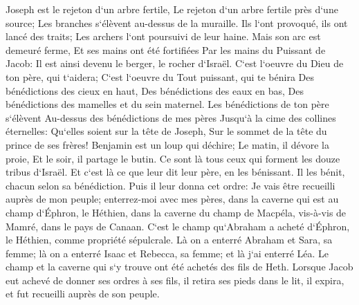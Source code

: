 \verse Joseph est le rejeton d`un arbre fertile, Le rejeton d`un arbre fertile près d`une source; Les branches s`élèvent au-dessus de la muraille. 
\verse Ils l`ont provoqué, ils ont lancé des traits; Les archers l`ont poursuivi de leur haine. 
\verse Mais son arc est demeuré ferme, Et ses mains ont été fortifiées Par les mains du Puissant de Jacob: Il est ainsi devenu le berger, le rocher d`Israël. 
\verse C`est l`oeuvre du Dieu de ton père, qui t`aidera; C`est l`oeuvre du Tout puissant, qui te bénira Des bénédictions des cieux en haut, Des bénédictions des eaux en bas, Des bénédictions des mamelles et du sein maternel. 
\verse Les bénédictions de ton père s`élèvent Au-dessus des bénédictions de mes pères Jusqu`à la cime des collines éternelles: Qu`elles soient sur la tête de Joseph, Sur le sommet de la tête du prince de ses frères! 
\verse Benjamin est un loup qui déchire; Le matin, il dévore la proie, Et le soir, il partage le butin. 
\verse Ce sont là tous ceux qui forment les douze tribus d`Israël. Et c`est là ce que leur dit leur père, en les bénissant. Il les bénit, chacun selon sa bénédiction. 
\verse Puis il leur donna cet ordre: Je vais être recueilli auprès de mon peuple; enterrez-moi avec mes pères, dans la caverne qui est au champ d`Éphron, le Héthien, 
\verse dans la caverne du champ de Macpéla, vis-à-vis de Mamré, dans le pays de Canaan. C`est le champ qu`Abraham a acheté d`Éphron, le Héthien, comme propriété sépulcrale. 
\verse Là on a enterré Abraham et Sara, sa femme; là on a enterré Isaac et Rebecca, sa femme; et là j`ai enterré Léa. 
\verse Le champ et la caverne qui s`y trouve ont été achetés des fils de Heth. 
\verse Lorsque Jacob eut achevé de donner ses ordres à ses fils, il retira ses pieds dans le lit, il expira, et fut recueilli auprès de son peuple. 

